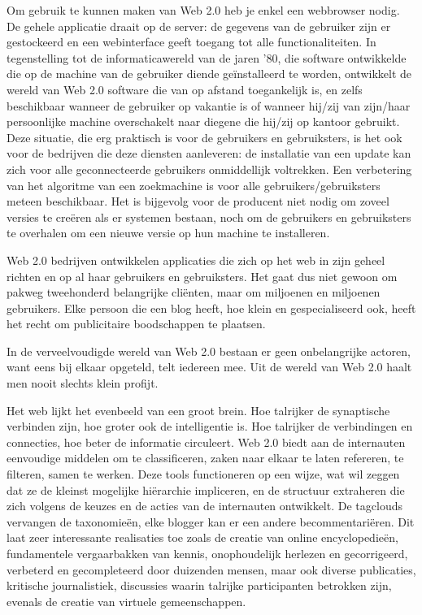 {
Om gebruik te kunnen maken van Web 2.0 heb je enkel een webbrowser
nodig. De gehele applicatie draait op de server: de gegevens van de
gebruiker zijn er gestockeerd en een webinterface geeft toegang tot
alle functionaliteiten. In tegenstelling tot de informaticawereld van
de jaren '80, die software ontwikkelde die op de machine van de
gebruiker diende ge\"installeerd te worden, ontwikkelt de wereld van
Web 2.0 software die van op afstand toegankelijk is, en zelfs
beschikbaar wanneer de gebruiker op vakantie is of wanneer hij/zij van
zijn/haar persoonlijke machine overschakelt naar diegene die hij/zij op
kantoor gebruikt. Deze situatie, die erg praktisch is voor de
gebruikers en gebruiksters, is het ook voor de bedrijven die deze
diensten aanleveren: de installatie van een update kan zich voor alle
geconnecteerde gebruikers onmiddellijk voltrekken. Een verbetering van
het algoritme van een zoekmachine is voor alle gebruikers/gebruiksters
meteen beschikbaar. Het is bijgevolg voor de producent niet nodig om
zoveel versies te cre\"eren als er systemen bestaan, noch om de
gebruikers en gebruiksters te overhalen om een nieuwe versie op hun
machine te installeren. 

Web 2.0 bedrijven ontwikkelen applicaties die zich op het web in zijn
geheel richten en op al haar gebruikers en gebruiksters. Het gaat dus
niet gewoon om pakweg tweehonderd belangrijke cli\"enten, maar om
miljoenen en miljoenen gebruikers. Elke persoon die een blog heeft, hoe
klein en gespecialiseerd ook, heeft het recht om publicitaire
boodschappen te plaatsen.

In de verveelvoudigde wereld van Web 2.0 bestaan er geen onbelangrijke
actoren, want eens bij elkaar opgeteld, telt iedereen mee. Uit de
wereld van Web 2.0 haalt men nooit slechts klein profijt.

\page

Het web lijkt het evenbeeld van een groot brein. Hoe talrijker de
synaptische verbinden zijn, hoe groter ook de intelligentie is. Hoe
talrijker de verbindingen en connecties, hoe beter de informatie
circuleert. Web 2.0 biedt aan de internauten eenvoudige middelen om te
classificeren, zaken naar elkaar te laten refereren, te filteren, samen
te werken. Deze tools functioneren op een  wijze, wat
wil zeggen dat ze de kleinst mogelijke hi\"erarchie impliceren, en de
structuur extraheren die zich volgens de keuzes en de acties van de
internauten ontwikkelt. De tagclouds vervangen de taxonomie\"en, elke
blogger kan er een andere becommentari\"eren. Dit laat zeer
interessante realisaties toe zoals de creatie van online
encyclopedie\"en, fundamentele vergaarbakken van kennis, onophoudelijk
herlezen en gecorrigeerd, verbeterd en gecompleteerd door duizenden
mensen, maar ook diverse publicaties, kritische journalistiek,
discussies waarin talrijke participanten betrokken zijn, evenals de
creatie van virtuele gemeenschappen.

}
